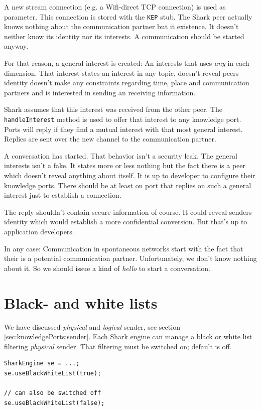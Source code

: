A new stream connection (e.g. a Wifi-direct TCP connection) is used as parameter. This connection is stored with the {\tt KEP} stub. The Shark peer actually knows nothing about the communication partner but it existence. It doesn't neither know its identity nor its interests. A communication should be started anyway.

For that reason, a general interest is created: An interests that uses {\it any} in each dimension. That interest states an interest in any topic, doesn't reveal peers identity doesn't make any constraints regarding time, place and communication partners and is interested in sending an receiving information.

Shark assumes that this interest was received from the other peer. The {\tt handleInterest} method is used to offer that interest to any knowledge port. Ports will reply if they find a mutual interest with that most general interest. Replies are sent over the new channel to the communication partner.

A conversation has started. That behavior isn't a security leak. The general interests isn't a fake. It states more or less nothing but the fact there is a peer which doesn't reveal anything about itself. It is up to developer to configure their knowledge ports. There should be at least on port that replies on such a general interest just to establish a connection.

The reply shouldn't contain secure information of course. It could reveal senders identity which would establish a more confidential conversion. 
But that's up to application developers.

In any case: Communication in spontaneous networks start with the fact that their is a potential communication partner. Unfortunately, we don't know nothing about it. So we should issue a kind of {\it hello} to start a conversation.

\section{Black- and white lists}
We have discussed {\it physical} and {\it logical} sender, see section \ref{sec:knowledgePorts:sender}. Each Shark engine can manage a black or white list filtering {\it physical} sender. That filtering must be switched on; default is off.

\begin{verbatim}
SharkEngine se = ...;
se.useBlackWhiteList(true);

// can also be switched off
se.useBlackWhiteList(false);
\end{verbatim}

